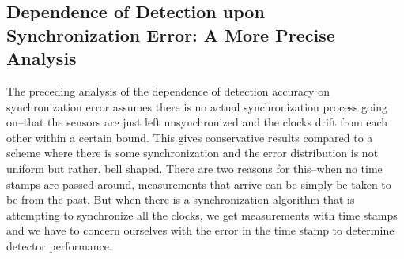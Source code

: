 \subsection{Dependence of Detection upon Synchronization Error: A More Precise Analysis}
The preceding analysis of the dependence of detection accuracy on synchronization error assumes there is no actual synchronization process going on--that the sensors are just left unsynchronized and the clocks drift from each other within a certain bound. This gives conservative results compared to a scheme where there is some synchronization and the error distribution is not uniform but rather, bell shaped. 
There are two reasons for this--when no time stamps are passed around, measurements that arrive can be simply be taken to be from the past. But when there is a synchronization algorithm that is attempting to synchronize all the clocks, we get measurements with time stamps and we have to concern ourselves with the error in the time stamp to determine detector performance.

